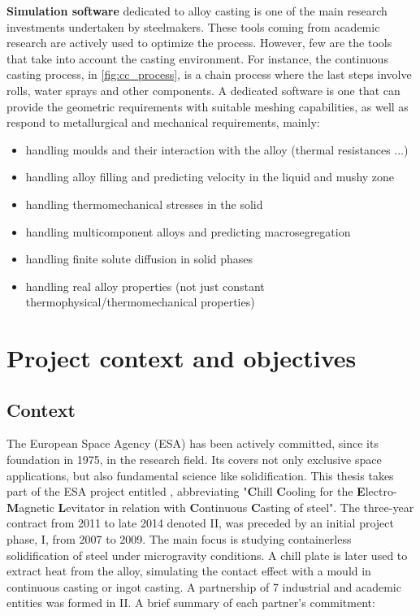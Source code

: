 \textbf{Simulation software} dedicated to alloy casting is one of the main research investments undertaken by steelmakers. These tools coming from academic research
are actively used to optimize the process. However, few are the tools that take into account the casting environment. For instance, the continuous casting process, in
\cref{fig:cc_process}, is a chain process where the last steps involve rolls, water sprays and other components. A dedicated software is one that can provide the
geometric requirements with suitable meshing capabilities, as well as respond to metallurgical and mechanical requirements, mainly:
\begin{itemize}
\itemsep0em
\item handling moulds and their interaction with the alloy (thermal resistances ...)
\item handling alloy filling and predicting velocity in the liquid and mushy zone
\item handling thermomechanical stresses in the solid
\item handling multicomponent alloys and predicting macrosegregation
\item handling finite solute diffusion in solid phases
\item handling real alloy properties (not just constant thermophysical/thermomechanical properties)
\end{itemize}
\section{Project context and objectives}
\subsection{Context}
The European Space Agency (ESA) has been actively committed, since its foundation in 1975, in the research field.
Its covers not only exclusive space applications, but also fundamental science like solidification. 
This thesis takes part of the ESA project entitled \ccemlcc, abbreviating
"\textbf{C}hill \textbf{C}ooling for the \textbf{E}lectro-\textbf{M}agnetic \textbf{L}evitator in relation with 
\textbf{C}ontinuous \textbf{C}asting of steel".
The three-year contract from 2011 to late 2014 denoted \ccemlcc II, was preceded by an initial project phase, \ccemlcc I,
from 2007 to 2009. The main focus is studying containerless solidification of steel under microgravity conditions. 
A chill plate is later used to extract heat from the alloy, simulating the contact effect with a mould in continuous casting
or ingot casting.
A partnership of 7 industrial and academic entities was formed in \ccemlcc II. A brief summary of each partner's commitment:\\

